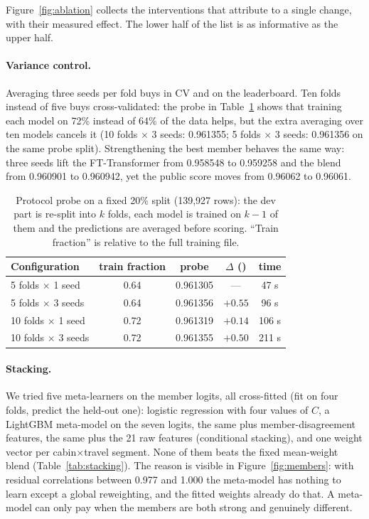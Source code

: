Figure~\ref{fig:ablation} collects the interventions that attribute to a single change, with
their measured effect. The lower half of the list is as informative as the upper half.

\paragraph{Variance control.} Averaging three seeds per fold buys  in CV and
 on the leaderboard. Ten folds instead of five buys  cross-validated: the
probe in Table~\ref{tab:protocol} shows that training each model on 72\% instead of 64\% of the
data helps, but the extra averaging over ten models cancels it (10 folds $\times$ 3 seeds:
0.961355; 5 folds $\times$ 3 seeds: 0.961356 on the same probe split). Strengthening the best
member behaves the same way: three seeds lift the FT-Transformer from 0.958548 to 0.959258 and
the blend from 0.960901 to 0.960942, yet the public score moves from 0.96062 to 0.96061.

\begin{table}[t]
\centering
\small
\caption{Protocol probe on a fixed 20\% split (139{,}927 rows): the dev part is re-split into
$k$ folds, each model is trained on $k-1$ of them and the predictions are averaged before
scoring. ``Train fraction'' is relative to the full training file.}
\label{tab:protocol}
\begin{tabular}{lcccc}
\toprule
Configuration & train fraction & probe \auc{} & $\Delta$ (\dlt{}) & time\\
\midrule
5 folds $\times$ 1 seed   & 0.64 & 0.961305 & --- & 47 s\\
5 folds $\times$ 3 seeds  & 0.64 & 0.961356 & $+0.55$ & 96 s\\
10 folds $\times$ 1 seed  & 0.72 & 0.961319 & $+0.14$ & 106 s\\
10 folds $\times$ 3 seeds & 0.72 & 0.961355 & $+0.50$ & 211 s\\
\bottomrule
\end{tabular}
\end{table}

\paragraph{Stacking.}
\label{sec:stacking}
We tried five meta-learners on the member logits, all cross-fitted (fit on four folds, predict
the held-out one): logistic regression with four values of $C$, a LightGBM meta-model on the
seven logits, the same plus member-disagreement features, the same plus the 21 raw features
(conditional stacking), and one weight vector per cabin$\times$travel segment. None of them
beats the fixed mean-weight blend (Table~\ref{tab:stacking}). The reason is visible in
Figure~\ref{fig:members}: with residual correlations between 0.977 and 1.000 the meta-model has
nothing to learn except a global reweighting, and the fitted weights already do that. A
meta-model can only pay when the members are both strong and genuinely different.

